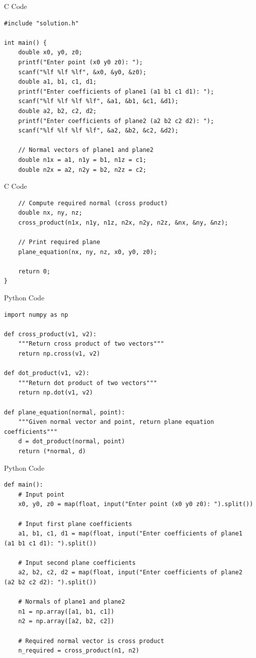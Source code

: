 \documentclass{beamer}
\begin{document}
\begin{frame}[fragile]{C Code}
    \begin{verbatim}
#include "solution.h"

int main() {
    double x0, y0, z0;
    printf("Enter point (x0 y0 z0): ");
    scanf("%lf %lf %lf", &x0, &y0, &z0);
    double a1, b1, c1, d1;
    printf("Enter coefficients of plane1 (a1 b1 c1 d1): ");
    scanf("%lf %lf %lf %lf", &a1, &b1, &c1, &d1);
    double a2, b2, c2, d2;
    printf("Enter coefficients of plane2 (a2 b2 c2 d2): ");
    scanf("%lf %lf %lf %lf", &a2, &b2, &c2, &d2);

    // Normal vectors of plane1 and plane2
    double n1x = a1, n1y = b1, n1z = c1;
    double n2x = a2, n2y = b2, n2z = c2;
    \end{verbatim}
\end{frame}

\begin{frame}[fragile]{C Code}
    \begin{verbatim}
    // Compute required normal (cross product)
    double nx, ny, nz;
    cross_product(n1x, n1y, n1z, n2x, n2y, n2z, &nx, &ny, &nz);

    // Print required plane
    plane_equation(nx, ny, nz, x0, y0, z0);

    return 0;
}
    \end{verbatim}
\end{frame}

\begin{frame}[fragile]{Python Code}
    \begin{verbatim}
import numpy as np

def cross_product(v1, v2):
    """Return cross product of two vectors"""
    return np.cross(v1, v2)

def dot_product(v1, v2):
    """Return dot product of two vectors"""
    return np.dot(v1, v2)

def plane_equation(normal, point):
    """Given normal vector and point, return plane equation coefficients"""
    d = dot_product(normal, point)
    return (*normal, d)
    \end{verbatim}
\end{frame}

\begin{frame}[fragile]{Python Code}
    \begin{verbatim}
def main():
    # Input point
    x0, y0, z0 = map(float, input("Enter point (x0 y0 z0): ").split())

    # Input first plane coefficients
    a1, b1, c1, d1 = map(float, input("Enter coefficients of plane1 (a1 b1 c1 d1): ").split())

    # Input second plane coefficients
    a2, b2, c2, d2 = map(float, input("Enter coefficients of plane2 (a2 b2 c2 d2): ").split())

    # Normals of plane1 and plane2
    n1 = np.array([a1, b1, c1])
    n2 = np.array([a2, b2, c2])

    # Required normal vector is cross product
    n_required = cross_product(n1, n2)
    \end{verbatim}
\end{frame}
\end{document}
